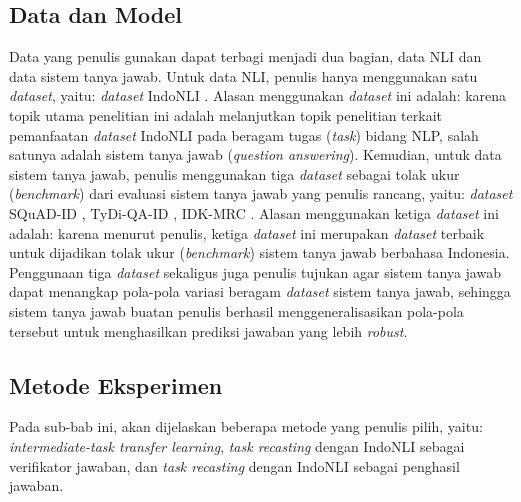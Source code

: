 \subsection{Data dan Model}
Data yang penulis gunakan dapat terbagi menjadi dua bagian, data NLI dan data sistem tanya jawab. Untuk data NLI, penulis hanya menggunakan satu \emph{dataset}, yaitu: \emph{dataset} IndoNLI \citep{mahendra-etal-2021-indonli}. Alasan menggunakan \emph{dataset} ini adalah: karena topik utama penelitian ini adalah melanjutkan topik penelitian \citet{mahendra-etal-2021-indonli} terkait pemanfaatan \emph{dataset} IndoNLI pada beragam tugas (\emph{task}) bidang NLP, salah satunya adalah sistem tanya jawab (\emph{question answering}). Kemudian, untuk data sistem tanya jawab, penulis menggunakan tiga \emph{dataset} sebagai tolak ukur (\emph{benchmark}) dari evaluasi sistem tanya jawab yang penulis rancang, yaitu: \emph{dataset} SQuAD-ID \citep{muis2020sequencetosequence}, TyDi-QA-ID \citep{cahyawijaya-etal-2021-indonlg}, IDK-MRC \citep{putri-oh-2022-idk}. Alasan menggunakan ketiga \emph{dataset} ini adalah: karena menurut penulis, ketiga \emph{dataset} ini merupakan \emph{dataset} terbaik untuk dijadikan tolak ukur (\emph{benchmark}) sistem tanya jawab berbahasa Indonesia. Penggunaan tiga \emph{dataset} sekaligus juga penulis tujukan agar sistem tanya jawab dapat menangkap pola-pola variasi beragam \emph{dataset} sistem tanya jawab, sehingga sistem tanya jawab buatan penulis berhasil menggeneralisasikan pola-pola tersebut untuk menghasilkan prediksi jawaban yang lebih \emph{robust}.

\subsection{Metode Eksperimen}
Pada sub-bab ini, akan dijelaskan beberapa metode yang penulis pilih, yaitu: \emph{intermediate-task transfer learning}, \emph{task recasting} dengan IndoNLI sebagai verifikator jawaban, dan \emph{task recasting} dengan IndoNLI sebagai penghasil jawaban. 

